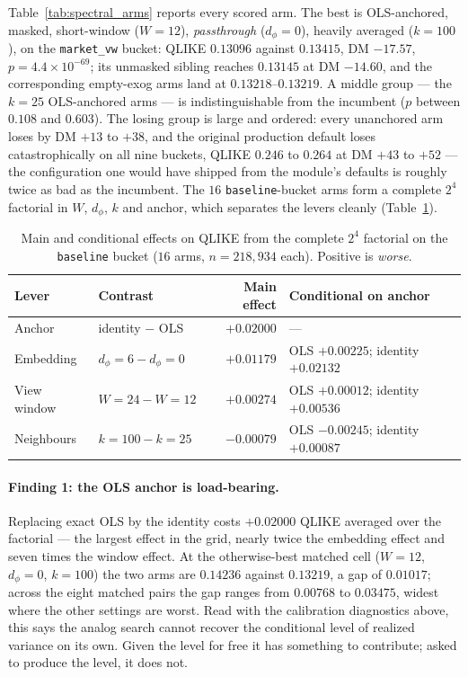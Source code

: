 Table~\ref{tab:spectral_arms} reports every scored arm. The best is OLS-anchored,
masked, short-window ($W = 12$), \emph{passthrough} ($d_\phi = 0$), heavily
averaged ($k = 100$), on the \texttt{market\_vw} bucket: QLIKE $0.13096$ against
$0.13415$, DM $-17.57$, $p = 4.4\times10^{-69}$; its unmasked sibling reaches
$0.13145$ at DM $-14.60$, and the corresponding empty-exog arms land at
$0.13218$--$0.13219$. A middle group --- the $k = 25$ OLS-anchored arms --- is
indistinguishable from the incumbent ($p$ between $0.108$ and $0.603$). The losing
group is large and ordered: every unanchored arm loses by DM $+13$ to $+38$, and
the original production default loses catastrophically on all nine buckets, QLIKE
$0.246$ to $0.264$ at DM $+43$ to $+52$ --- the configuration one would have
shipped from the module's defaults is roughly twice as bad as the incumbent. The
$16$ \texttt{baseline}-bucket arms form a complete $2^4$ factorial in $W$,
$d_\phi$, $k$ and anchor, which separates the levers cleanly
(Table~\ref{tab:spectral_effects}).

\begin{table}[H]
\centering
\small
\caption{Main and conditional effects on QLIKE from the complete $2^4$ factorial on
the \texttt{baseline} bucket ($16$ arms, $n = 218{,}934$ each). Positive is
\emph{worse}.}
\label{tab:spectral_effects}
\begin{tabular}{llrl}
\toprule
Lever & Contrast & Main effect & Conditional on anchor \\
\midrule
Anchor      & identity $-$ OLS          & $+0.02000$ & --- \\
Embedding   & $d_\phi{=}6 - d_\phi{=}0$ & $+0.01179$ & OLS $+0.00225$; identity $+0.02132$ \\
View window & $W{=}24 - W{=}12$         & $+0.00274$ & OLS $+0.00012$; identity $+0.00536$ \\
Neighbours  & $k{=}100 - k{=}25$        & $-0.00079$ & OLS $-0.00245$; identity $+0.00087$ \\
\bottomrule
\end{tabular}
\end{table}

\paragraph{Finding 1: the OLS anchor is load-bearing.}
Replacing exact OLS by the identity costs $+0.02000$ QLIKE averaged over the
factorial --- the largest effect in the grid, nearly twice the embedding effect and
seven times the window effect. At the otherwise-best matched cell ($W = 12$,
$d_\phi = 0$, $k = 100$) the two arms are $0.14236$ against $0.13219$, a gap of
$0.01017$; across the eight matched pairs the gap ranges from $0.00768$ to
$0.03475$, widest where the other settings are worst. Read with the calibration
diagnostics above, this says the analog search cannot recover the conditional level
of realized variance on its own. Given the level for free it has something to
contribute; asked to produce the level, it does not.

